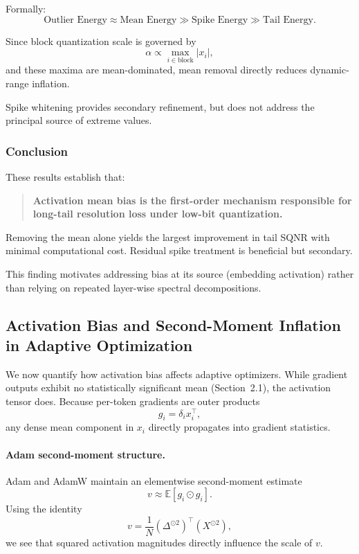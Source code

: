 Formally:
\[
\text{Outlier Energy} \approx
\text{Mean Energy} \gg \text{Spike Energy} \gg \text{Tail Energy}.
\]

Since block quantization scale is governed by
\[
\alpha \propto \max_{i \in \text{block}} |x_i|,
\]
and these maxima are mean-dominated,
mean removal directly reduces dynamic-range inflation.

Spike whitening provides secondary refinement,
but does not address the principal source of extreme values.

\subsubsection{Conclusion}

These results establish that:

\begin{quote}
\textbf{Activation mean bias is the first-order mechanism
responsible for long-tail resolution loss under low-bit quantization.}
\end{quote}

Removing the mean alone yields the largest improvement
in tail SQNR with minimal computational cost.
Residual spike treatment is beneficial but secondary.

This finding motivates addressing bias at its source
(embedding activation)
rather than relying on repeated layer-wise spectral decompositions.

\subsection{Activation Bias and Second-Moment Inflation in Adaptive Optimization}
\label{subsec:optimizer_bias}

We now quantify how activation bias affects adaptive optimizers.
While gradient outputs exhibit no statistically significant mean
(Section~2.1), the activation tensor does.
Because per-token gradients are outer products
\[
g_i = \delta_i x_i^\top,
\]
any dense mean component in $x_i$ directly propagates into gradient
statistics.

\paragraph{Adam second-moment structure.}
Adam and AdamW maintain an elementwise second-moment estimate
\[
v \approx \mathbb{E}[g_i \odot g_i].
\]
Using the identity
\[
v = \frac{1}{N}(\Delta^{\odot 2})^\top (X^{\odot 2}),
\]
we see that squared activation magnitudes directly influence the
scale of $v$.

